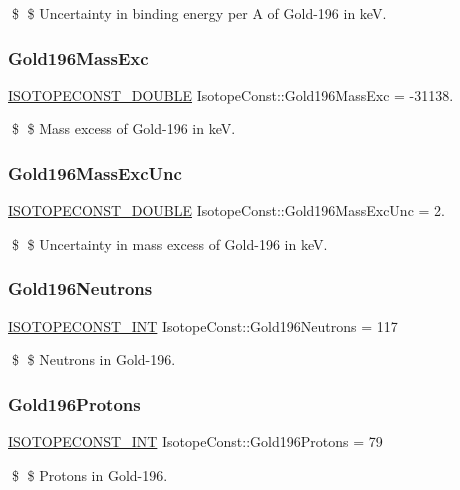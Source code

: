 \$ \$ Uncertainty in binding energy per A of Gold-\/196 in keV. \mbox{\label{group___isotope_const-_gold-_au196_gadc2e8a7cb6cf4f2ec6dc8edb0b9a27b5}} 
\subsubsection{\texorpdfstring{Gold196\+Mass\+Exc}{Gold196MassExc}}
{\footnotesize\ttfamily \mbox{\hyperlink{group___isotope_const-_macros_ga8f45a7272ce02c0b4c65c44636ed719a}{I\+S\+O\+T\+O\+P\+E\+C\+O\+N\+S\+T\+\_\+\+D\+O\+U\+B\+LE}} Isotope\+Const\+::\+Gold196\+Mass\+Exc = -\/31138.}

\$ \$ Mass excess of Gold-\/196 in keV. \mbox{\label{group___isotope_const-_gold-_au196_ga356259995793c41efbf402cff434d41e}} 
\subsubsection{\texorpdfstring{Gold196\+Mass\+Exc\+Unc}{Gold196MassExcUnc}}
{\footnotesize\ttfamily \mbox{\hyperlink{group___isotope_const-_macros_ga8f45a7272ce02c0b4c65c44636ed719a}{I\+S\+O\+T\+O\+P\+E\+C\+O\+N\+S\+T\+\_\+\+D\+O\+U\+B\+LE}} Isotope\+Const\+::\+Gold196\+Mass\+Exc\+Unc = 2.}

\$ \$ Uncertainty in mass excess of Gold-\/196 in keV. \mbox{\label{group___isotope_const-_gold-_au196_gaea8ee615a0af0d2e1819b6eac970079a}} 
\subsubsection{\texorpdfstring{Gold196\+Neutrons}{Gold196Neutrons}}
{\footnotesize\ttfamily \mbox{\hyperlink{group___isotope_const-_macros_ga5f18360b3e99483a35c32d789e62621c}{I\+S\+O\+T\+O\+P\+E\+C\+O\+N\+S\+T\+\_\+\+I\+NT}} Isotope\+Const\+::\+Gold196\+Neutrons = 117}

\$ \$ Neutrons in Gold-\/196. \mbox{\label{group___isotope_const-_gold-_au196_gac00d518a3cc1d980a26bda550422f3c0}} 
\subsubsection{\texorpdfstring{Gold196\+Protons}{Gold196Protons}}
{\footnotesize\ttfamily \mbox{\hyperlink{group___isotope_const-_macros_ga5f18360b3e99483a35c32d789e62621c}{I\+S\+O\+T\+O\+P\+E\+C\+O\+N\+S\+T\+\_\+\+I\+NT}} Isotope\+Const\+::\+Gold196\+Protons = 79}

\$ \$ Protons in Gold-\/196. 